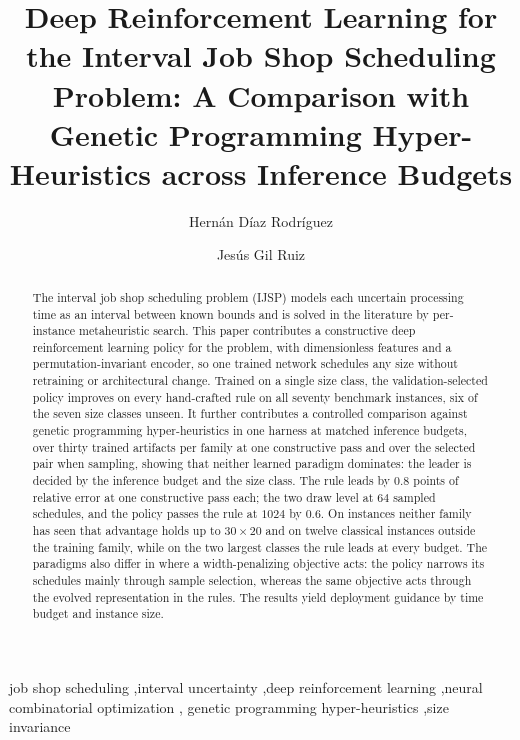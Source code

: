 \documentclass[preprint,authoryear,12pt]{elsarticle}
\theoremstyle{definition}
\theoremstyle{remark}
\begin{document}
\begin{frontmatter}

\title{Deep Reinforcement Learning for the Interval Job Shop
Scheduling Problem: A Comparison with Genetic Programming
Hyper-Heuristics across Inference Budgets}

\author[1]{Hern\'an D\'iaz Rodr\'iguez}
\author[2]{Jes\'us Gil Ruiz}
\address[1]{Department of Computing, University of Oviedo,
Gij\'on, Spain}
\address[2]{Universidad Europea de Madrid, Madrid, Spain}

\begin{abstract}
The interval job shop scheduling problem (IJSP) models each uncertain
processing time as an interval between known bounds and is solved in
the literature by per-instance metaheuristic search. This paper
contributes a constructive deep reinforcement learning policy for the
problem, with dimensionless features and a permutation-invariant
encoder, so one trained network schedules any size
without retraining or architectural change. Trained on a single
size class, the validation-selected policy improves on every
hand-crafted rule on all seventy benchmark instances, six
of the seven size classes unseen. It further contributes a
controlled comparison against genetic programming hyper-heuristics in
one harness at matched inference budgets, over thirty trained
artifacts per family at one constructive pass and over the selected
pair when sampling, showing that neither learned
paradigm dominates: the leader is decided by the inference budget and
the size class. The rule leads by $0.8$ points of relative error at one
constructive pass each; the two draw level at $64$ sampled schedules,
and the policy passes the rule at $1024$ by $0.6$. On instances
neither family has seen that advantage holds up to $30{\times}20$ and
on twelve classical instances outside the training family, while on
the two largest classes the rule leads at every budget. The paradigms
also differ in where a width-penalizing objective acts: the policy
narrows its schedules mainly through sample selection, whereas the
same objective acts through the evolved representation in the rules.
The results yield deployment guidance by time budget and instance size.
\end{abstract}

\begin{keyword}
job shop scheduling \sep interval uncertainty \sep deep
reinforcement learning \sep neural combinatorial optimization \sep
genetic programming hyper-heuristics \sep size invariance
\end{keyword}

\end{frontmatter}
\end{document}
